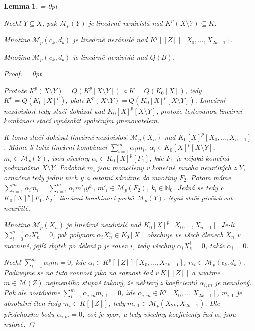 \documentclass[11pt,a4paper]{article}
\newcommand\m[1]{\mathbb { #1 }} %
\newcommand\p[1]{\mathcal{ #1 }} %
\newcommand\N{\m N}
\newenvironment{items}{%
	\itemize
	\itemsep = 0pt%
}{%
	\enditemize
}
\newcounter{numb}
\theoremstyle{definition}
\theoremstyle{plain}
\newtheorem{lemma}[numb]{Lemma}
\begin{document}
\begin{lemma} \label{thm:lin_indep} \hfill
	\begin{items}
		\item Nechť $Y \subseteq X$, pak $\p M_p(Y)$ je lineárně nezávislá nad $K^p(X \setminus Y) \subseteq K$.
		\item	Množina $\p M_p(c_k, d_k)$ je lineárně nezávislá nad $K^p[[Z]][X_0, \hdots, X_{2k - 1}]$.
		\item Množina $\p M_p(c_k, d_k)$ je lineárně nezávislá nad $Q(B)$. 
	\end{items}
	
	\begin{proof} \hfill
		\begin{items}
			\newcommand*{\I}{_{i = 1}^m}
			
			\item Protože $K^p(X \setminus Y) = Q(K^p[X \setminus Y])$ a $K = Q(K_0[X])$, tedy $K^p = Q(K_0[X]^p)$, platí $K^p(X \setminus Y) = Q(K_0[X]^p[X \setminus Y])$. Lineární nezávislost tedy stačí dokázat nad $K_0[X]^p[X \setminus Y]$, protože testovanou lineární kombinaci stačí vynásobit společným jmenovatelem.

			K tomu stačí dokázat lineární nezávislost $\p M_p(X_n)$ nad $K_0[X]^p[X_0, \hdots, X_{n - 1}]$. Máme-li totiž lineární kombinaci $\sum\I \alpha_i m_i$, $\alpha_i \in K_0[X]^p[X \setminus Y]$, $m_i \in \p M_p(Y)$, jsou všechny $\alpha_i \in K_0[X]^p[F_1]$, kde $F_1$ je nějaká konečná podmnožina $X \setminus Y$. Podobně $m_i$ jsou monočleny v konečně mnoha neurčitých z $Y$, označme tedy jednu nich $y$ a ostatní sdružme do množiny $F_2$. Potom máme $\sum\I \alpha_i m_i = \sum\I \alpha_i m'_i y^{k_i}$, $m'_i \in \p M_p(F_2)$, $k_i \in \N_0$. Jedná se tedy o $K_0[X]^p[F_1, F_2]$-lineární kombinaci prvků $\p M_p(Y)$. Nyní stačí přečíslovat neurčité.
			
			Množina $\p M_p(X_n)$ je lineárně nezávislá nad $K_0[X]^p[X_0, \hdots, X_{n - 1}]$. Je-li $\sum_{i = 0}^{p - 1} \alpha_i X_n^i = 0$, pak polynom $\alpha_i X_n^i \in K_0[X]$ obsahuje ve všech členech $X_n$ v mocnině, jejíž zbytek po dělení $p$ je roven $i$, tedy všechny $\alpha_i X_n^i = 0$, takže $\alpha_i = 0$.
			
			\item Nechť $\sum\I \alpha_i m_i = 0$, kde $\alpha_i \in K^p[[Z]][X_0, \hdots, X_{2k - 1}]$, $m_i \in \p M_p(c_k, d_k)$. Podívejme se na tuto rovnost jako na rovnost řad v $K[[Z]]$ a uvažme $m \in \p M(Z)$ nejmenšího stupně takový, že některý z koeficientů $\alpha_{i, m}$ je nenulový. Pak ale dostáváme $\sum\I \alpha_{i, m} m_{i, 1} = 0$, kde $\alpha_{i, m} \in K^p[X_0, \hdots, X_{2k - 1}]$, $m_{i, 1}$ je absolutní člen řady $m_i \in K[[Z]]$, tedy $m_{i, 1} \in \p M_p(X_{2k}, X_{2k + 1})$. Dle předchozího bodu $\alpha_{i, m} = 0$, což je spor, a tedy všechny koeficienty řad $\alpha_i$ jsou nulové.
			

\end{items}
\end{proof}
\end{lemma}
\end{document}
